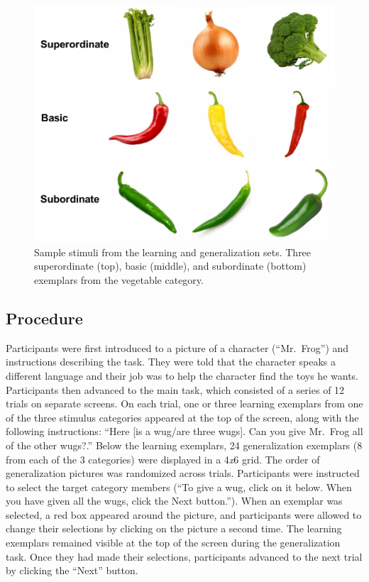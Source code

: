 \documentclass[english,floatsintext,man]{apa6}
\theoremstyle{definition}
\theoremstyle{definition}
\theoremstyle{definition}
\theoremstyle{remark}
\begin{document}
\begin{figure}[t!]

{\centering \includegraphics[width=0.5\linewidth]{figs/stim} 

}

\caption{Sample stimuli from the learning and generalization sets. Three superordinate (top), basic (middle), and subordinate (bottom) exemplars from the vegetable category.}\label{fig:unnamed-chunk-1}
\end{figure}

\subsection{Procedure}\label{procedure}

Participants were first introduced to a picture of a character
(\enquote{Mr.~Frog}) and instructions describing the task. They were
told that the character speaks a different language and their job was to
help the character find the toys he wants. Participants then advanced to
the main task, which consisted of a series of 12 trials on separate
screens. On each trial, one or three learning exemplars from one of the
three stimulus categories appeared at the top of the screen, along with
the following instructions: \enquote{Here {[}is a wug/are three wugs{]}.
Can you give Mr.~Frog all of the other wugs?.} Below the learning
exemplars, 24 generalization exemplars (8 from each of the 3 categories)
were displayed in a 4\emph{x}6 grid. The order of generalization
pictures was randomized across trials. Participants were instructed to
select the target category members (\enquote{To give a wug, click on it
below. When you have given all the wugs, click the Next button.}). When
an exemplar was selected, a red box appeared around the picture, and
participants were allowed to change their selections by clicking on the
picture a second time. The learning exemplars remained visible at the
top of the screen during the generalization task. Once they had made
their selections, participants advanced to the next trial by clicking
the \enquote{Next} button.
\end{document}
